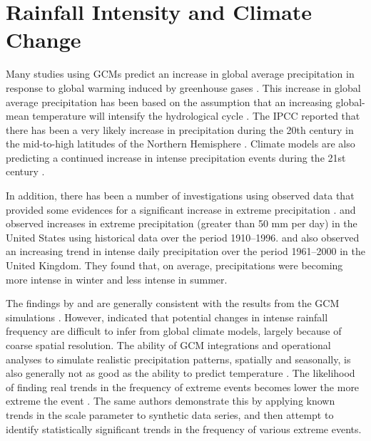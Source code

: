 \section{Rainfall Intensity and Climate Change}
\label{sec:RainfallIntensityAndClimateChange}

Many studies using GCMs predict an increase in global average precipitation in
response to global warming induced by greenhouse gases
\citep{houghton1996-climate,ipcc2001-1032,ipcc2001-881,jones2001-1337}. This
increase in global average precipitation has been based on the assumption that
an increasing global-mean temperature will intensify the hydrological cycle
\citep{houghton1996-climate}. The IPCC reported that there has been a very
likely increase in precipitation during the 20th century in the mid-to-high
latitudes of the Northern Hemisphere \citep{ipcc2001-881}. Climate models are
also predicting a continued increase in intense precipitation events during the
21st century \citep{ipcc2001-1032}.

In addition, there has been a number of investigations using observed data
that provided some evidences for a significant increase in extreme precipitation
\citep{karl1995-217,karl1998-231,osborn2000-347,osborn2002-1313}.
\citet{karl1995-217} and \citet{karl1998-231} observed increases in extreme
precipitation (greater than 50 mm per day) in the United States using historical
data over the period 1910--1996. \citet{osborn2000-347} and
\citet{osborn2002-1313} also observed an increasing trend in intense daily
precipitation over the period 1961--2000 in the United Kingdom. They found that,
on average, precipitations were becoming more intense in winter and less intense
in summer.

The findings by \citet{osborn2000-347} and \citet{osborn2002-1313} are generally
consistent with the results from the GCM simulations
\citep{jones1997-265,jones2001-1337}. However,
\citet{ipcc2001-1032,ipcc2001-881} indicated that potential changes in intense
rainfall frequency are difficult to infer from global climate models, largely
because of coarse spatial resolution. The ability of GCM integrations and
operational analyses to simulate realistic precipitation patterns, spatially and
seasonally, is also generally not as good as the ability to predict temperature
\citep{mcguffie1999-1}. The likelihood of finding real trends in the frequency
of extreme events becomes lower the more extreme the event
\citep{frei2001-1568}. The same authors demonstrate this by applying known
trends in the scale parameter to synthetic data series, and then attempt to
identify statistically significant trends in the frequency of various extreme
events.

